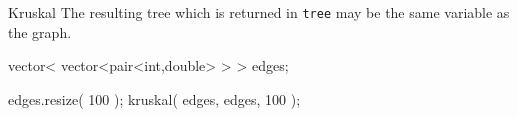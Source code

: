 
\begin{algorithm}{Kruskal}
\desc
The resulting tree which is returned in {\tt tree} may
be the same variable as the graph.
\begin{example}
	vector< vector<pair<int,double> > > edges;

	edges.resize( 100 );
	kruskal( edges, edges, 100 );
\end{example}
\end{algorithm}
